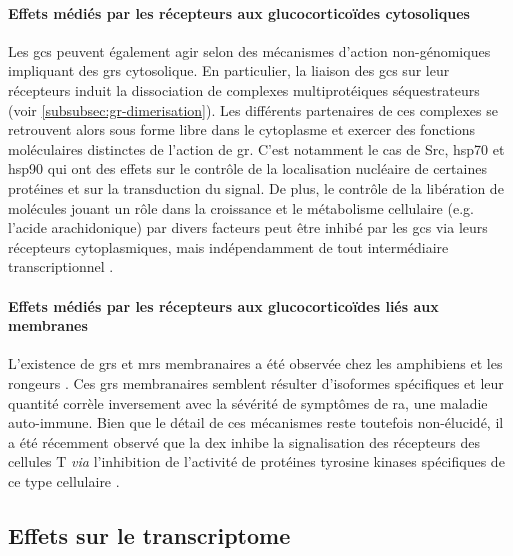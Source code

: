 \documentclass[../main.tex]{subfiles}
\begin{document}
\paragraph{Effets médiés par les récepteurs aux glucocorticoïdes cytosoliques}
Les \glspl{gc} peuvent également agir selon des mécanismes d'action non-génomiques impliquant des \glspl{gr} cytosolique.
En particulier, la liaison des \glspl{gc} sur leur récepteurs induit la dissociation de complexes multiprotéiques séquestrateurs (voir \autoref{subsubsec:gr-dimerisation}).
Les différents partenaires de ces complexes se retrouvent alors sous forme libre dans le cytoplasme et exercer des fonctions moléculaires distinctes de l'action de \gls{gr}.
C'est notamment le cas de \gls{Src}, \gls{hsp70} et \gls{hsp90} \citep{Croxtall2000,Marchetti2003,Tumlin1997} qui ont des effets sur le contrôle de la localisation nucléaire de certaines protéines et sur la transduction du signal.
De plus, le contrôle de la libération de molécules jouant un rôle dans la croissance et le métabolisme cellulaire (e.g. l'acide arachidonique) par divers facteurs peut être inhibé par les \glspl{gc} via leurs récepteurs cytoplasmiques, mais indépendamment de tout intermédiaire transcriptionnel \citep{Croxtall2000}.

\paragraph{Effets médiés par les récepteurs aux glucocorticoïdes liés aux membranes}
L'existence de \glspl{gr} et \glspl{mr} membranaires a été observée chez les amphibiens et les rongeurs \citep{Orchinik1991,Gametchu1999}.
Ces \glspl{gr} membranaires semblent résulter d'isoformes spécifiques \citep{Bartholome2004} et leur quantité corrèle inversement avec la sévérité de symptômes de \gls{ra}, une maladie auto-immune.
Bien que le détail de ces mécanismes reste toutefois non-élucidé, il a été récemment observé que la \gls{dex} inhibe la signalisation des récepteurs des cellules T \textit{via} l'inhibition de l'activité de protéines tyrosine kinases spécifiques de ce type cellulaire \citep{Lowenberg2006}.


\subsection{Effets sur le transcriptome}
\end{document}
